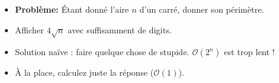 \begin{frame}
    \frametitle{\problemtitle}
    \begin{itemize}
        \item<+-> \textbf{Problème:} Étant donné l'aire $n$ d'un carré, donner son périmètre.
        \item<+-> Afficher $4\sqrt{n}$ avec suffisamment de digits.
        \item<+-> Solution na\"ive : faire quelque chose de stupide. $\mathcal O(2^n)$ est trop lent !
        \item<+-> À la place, calculez juste la réponse ($\mathcal O(1)$).
    \end{itemize}
    \solvestats
\end{frame}
